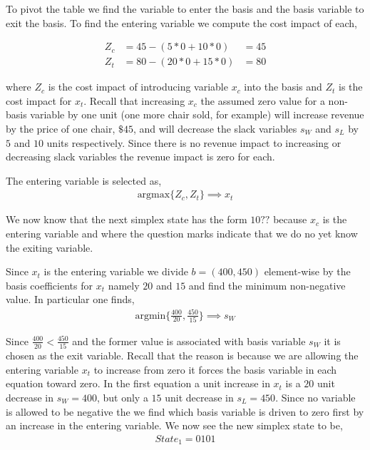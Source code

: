 To pivot the table we find the variable to enter the basis and the
basis variable to exit the basis. To find the entering variable we
compute the cost impact of each,

\begin{align*}
Z_c &= 45 - (5*0 + 10*0) &= 45\\
Z_t &= 80 - (20*0 + 15*0) &= 80
\end{align*}

where $Z_c$ is the cost impact of introducing variable $x_c$ into the
basis and $Z_t$ is the cost impact for $x_t$. Recall that increasing
$x_c$ the assumed zero value for a non-basis variable by one unit (one
more chair sold, for example) will increase revenue by the price of
one chair, $\$45$, and will decrease the slack variables $s_W$ and
$s_L$ by $5$ and $10$ units respectively. Since there is no revenue
impact to increasing or decreasing slack variables the revenue impact
is zero for each. 

The entering variable is selected as,
\begin{align*}
\text{argmax}\{Z_c, Z_t\} \implies x_t
\end{align*}

We now know that the next simplex state has the form $10??$ because
$x_c$ is the entering variable and where the question marks indicate
that we do no yet know the exiting variable. 

Since $x_t$ is the entering variable we divide $b = (400, 450)$
element-wise by the basis coefficients for $x_t$ namely $20$ and $15$
and find the minimum non-negative value. In particular one finds,
\begin{align*}
\text{argmin}\{\frac{400}{20}, \frac{450}{15}\} \implies s_W
\end{align*}

Since $\frac{400}{20} < \frac{450}{15}$ and the former value is
associated with basis variable $s_W$ it is chosen as the exit
variable. Recall that the reason is because we are allowing the
entering variable $x_t$ to increase from zero it forces the basis
variable in each equation toward zero. In the first equation a unit
increase in $x_t$ is a $20$ unit decrease in $s_W = 400$, but only a
$15$ unit decrease in $s_L = 450$. Since no variable is allowed to be
negative the we find which basis variable is driven to zero
first by an increase in the entering variable. We now see the new
simplex state to be,
\begin{align*}
State_1 = 0101
\end{align*}

